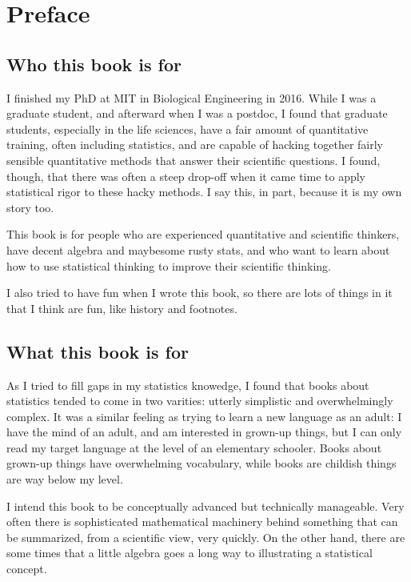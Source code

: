 \chapter{Preface}

\section*{Who this book is for}

I finished my PhD at MIT in Biological Engineering in 2016. While I was a
graduate student, and afterward when I was a postdoc, I found that graduate
students, especially in the life sciences, have a fair amount of quantitative
training, often including statistics, and are capable of hacking together
fairly sensible quantitative methods that answer their scientific questions. I
found, though, that there was often a steep drop-off when it came time to apply
statistical rigor to these hacky methods. I say this, in part, because it is my
own story too.

This book is for people who are experienced quantitative and scientific
thinkers, have decent algebra and maybesome rusty stats, and who want to learn
about how to use statistical thinking to improve their scientific thinking.

I also tried to have fun when I wrote this book, so there are lots of things in
it that I think are fun, like history and footnotes.

\section*{What this book is for}

As I tried to fill gaps in my statistics knowedge, I found that books about
statistics tended to come in two varities: utterly simplistic and
overwhelmingly complex. It was a similar feeling as trying to learn a new
language as an adult: I have the mind of an adult, and am interested in
grown-up things, but I can only read my target language at the level of an
elementary schooler. Books about grown-up things have overwhelming vocabulary,
while books are childish things are way below my level.

I intend this book to be conceptually advanced but technically manageable. Very
often there is sophisticated mathematical machinery behind something that can
be summarized, from a scientific view, very quickly. On the other hand, there
are some times that a little algebra goes a long way to illustrating a
statistical concept.

